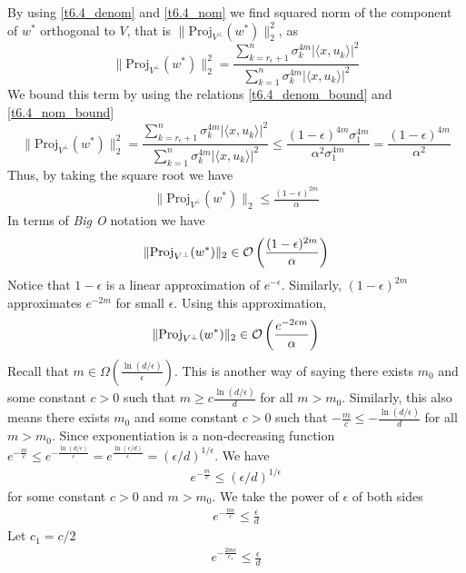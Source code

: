\documentclass[a4paper, english, headtopline=0.08em, headsepline=0.04em, left = 1cm, right = 1cm, DIV=15]{article}
\begin{document}
By using \ref{t6.4_denom} and \ref{t6.4_nom} we find squared norm of the component of $w^*$ orthogonal to $V$, that is $\|\text{Proj}_{V^{\bot }}(w^*)\|_2^2$, as
$$
\|\text{Proj}_{V^{\bot }}(w^*)\|_2^2
= \frac{\sum_{k=r_\epsilon + 1}^n \sigma_k^{4m} |\langle x, u_k \rangle|^2}{\sum_{k=1}^n \sigma_k^{4m} |\langle x, u_k \rangle|^2}
$$
We bound this term by using the relations \ref{t6.4_denom_bound} and \ref{t6.4_nom_bound}
$$
\|\text{Proj}_{V^{\bot }}(w^*)\|_2^2=
\frac{\sum_{k=r_\epsilon + 1}^n \sigma_k^{4m} |\langle x, u_k \rangle|^2}{\sum_{k=1}^n \sigma_k^{4m} |\langle x, u_k \rangle|^2}
\leq \frac{(1-\epsilon)^{4m} \sigma_1^{4m}}{\alpha^2 \sigma_1^{4m}}
= \frac{(1-\epsilon)^{4m}}{\alpha^2}
$$
Thus, by taking the square root we have
\begin{align*}
	\|\text{Proj}_{V^{\bot }}(w^*)\|_2 \leq \frac{(1-\epsilon)^{2m}}{\alpha}
\end{align*}
In terms of \textit{Big O} notation we have
\begin{align*}
	\|\text{Proj}_{V^{\bot }}(w^*)\|_2 \in \mathcal{O}\left(\frac{(1-\epsilon)^{2m}}{\alpha}\right) 
\end{align*}
Notice that $1-\epsilon$ is a linear approximation of $e^{-\epsilon}$. Similarly, $(1-\epsilon)^{2m}$ approximates
$e^{-2m}$ for small $\epsilon$. Using this approximation,
\begin{align*}
	\|\text{Proj}_{V^{\bot }}(w^*)\|_2 \in \mathcal{O}\left(\frac{e^{-2\epsilon m}}{\alpha}\right) 
\end{align*}
Recall that $m\in \Omega\left(\frac{\ln(d/\epsilon)}{\epsilon}\right)$. This is another way
of saying there exists $m_0$ and some constant $c>0$ such that $m \geq c\frac{\ln(d/\epsilon)}{d}$ for all $m>m_0$.
Similarly, this also means there exists $m_0$ and some 
constant $c>0$ such that $-\frac{m}{c} \leq -\frac{\ln(d/\epsilon)}{d}$ for all $m>m_0$.
Since exponentiation is a non-decreasing function $e^{-\frac{m}{c}} \leq e^{-\frac{\ln(d/\epsilon)}{\epsilon}} = e^{\frac{\ln(\epsilon/d)}{\epsilon}} = (\epsilon/d)^{1/\epsilon}$. We have
\begin{align*}
	e^{-\frac{m}{c}} \leq (\epsilon/d)^{1/\epsilon}
\end{align*}
for some constant $c>0$ and $m>m_0$. 
We take the power of $\epsilon$ of both sides
\begin{align*}
	e^{-\frac{m\epsilon}{c}} \leq \frac{\epsilon}{d}
\end{align*}
Let $c_1 = c/2$
\begin{align*}
	e^{-\frac{2m\epsilon}{c_1}} \leq \frac{\epsilon}{d}
\end{align*}
\end{document}
